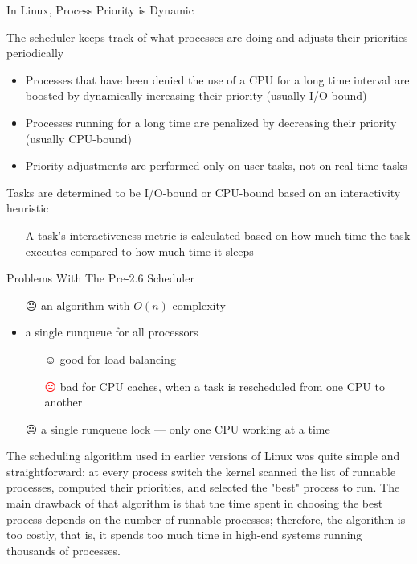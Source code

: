 \begin{frame}{In Linux, Process Priority is Dynamic}
    \begin{block}{The scheduler keeps track of what processes are doing and adjusts their
      priorities periodically}
    \begin{itemize}
    \item Processes that have been denied the use of a CPU for a long time interval are boosted by
      dynamically increasing their priority (usually I/O-bound)
    \item Processes running for a long time are penalized by decreasing their priority (usually CPU-bound)
    \item Priority adjustments are performed only on user tasks, not on real-time tasks
    \end{itemize}
  \end{block}
  \begin{block}{Tasks are determined to be I/O-bound or CPU-bound based on an interactivity
      heuristic}
    \begin{itemize}
    \item[] A task's interactiveness metric is calculated based on how much time the task executes
      compared to how much time it sleeps
    \end{itemize}
  \end{block}
\end{frame}

\begin{frame}{Problems With The Pre-2.6 Scheduler}
  \begin{itemize}
  \item[😐] an algorithm with $O(n)$ complexity
  \item a single runqueue for all processors
    \begin{itemize}
    \item[☺] good for load balancing
    \item[\textcolor{red}{☹}] bad for CPU caches, when a task is rescheduled from one CPU to another
    \end{itemize}
  \item[😐] a single runqueue lock --- only one CPU working at a time
  \end{itemize}
\end{frame}

The scheduling algorithm used in earlier versions of Linux was quite simple and
straightforward: at every process switch the kernel scanned the list of runnable
processes, computed their priorities, and selected the "best" process to run. The main
drawback of that algorithm is that the time spent in choosing the best process depends on
the number of runnable processes; therefore, the algorithm is too costly, that is, it
spends too much time in high-end systems running thousands of processes.

